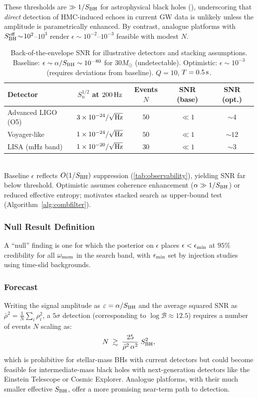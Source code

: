 \documentclass[11pt,a4paper]{article}
\newcommand{\HMC}{\textsc{HMC}\xspace}
\theoremstyle{plain}
\theoremstyle{definition}
\theoremstyle{remark}
\begin{document}
These thresholds are $\gg 1/S_{\rm BH}$ for astrophysical black holes (), underscoring that \emph{direct} detection of \HMC{}-induced echoes in current GW data is unlikely unless the amplitude is parametrically enhanced. 
By contrast, analogue platforms with $S_{\rm BH}^{\rm eff}\!\sim\!10^2$--$10^3$ render $\epsilon\sim 10^{-2}$--$10^{-3}$ feasible with modest $N$.

\begin{table}[t]
\centering
\caption{Back-of-the-envelope SNR for illustrative detectors and stacking assumptions. Baseline: $\epsilon\sim \alpha/S_{\rm BH}\sim 10^{-80}$ for $30M_\odot$ (undetectable). Optimistic: $\epsilon\sim 10^{-3}$ (requires deviations from baseline). $Q=10$, $T=0.5\,{\rm s}$.}
\label{tab:snr}
\small
\begin{tabular}{lcccc}
\hline
Detector & $S_n^{1/2}$ at $200\,{\rm Hz}$ & Events $N$ & SNR (base) & SNR (opt.) \\
\hline
Advanced LIGO (O5) & $3\times 10^{-24}/\sqrt{\rm Hz}$ & $50$ & $\ll 1$ & $\sim 4$ \\
Voyager-like & $1\times 10^{-24}/\sqrt{\rm Hz}$ & $50$ & $\ll 1$ & $\sim 12$ \\
LISA (mHz band) & $1\times 10^{-20}/\sqrt{\rm Hz}$ & $30$ & $\ll 1$ & $\sim 3$ \\
\hline
\end{tabular}
\\[0.5em]
\small Baseline $\epsilon$ reflects $O(1/S_{\rm BH})$ suppression (\cref{tab:observability}), yielding SNR far below threshold. Optimistic assumes coherence enhancement ($\alpha\gg 1/S_{\rm BH}$) or reduced effective entropy; motivates stacked search as upper-bound test (Algorithm~\ref{alg:combfilter}).
\end{table}
\subsubsection{Null Result Definition}
A ``null'' finding is one for which the posterior on $\epsilon$ places $\epsilon<\epsilon_{\rm min}$ at $95\%$ credibility for all $\omega_{\rm mem}$ in the search band,
with $\epsilon_{\rm min}$ set by injection studies using time-slid backgrounds.

\subsubsection{Forecast} Writing the signal amplitude as $\varepsilon=\alpha/S_{\rm BH}$ and the average squared SNR as $\bar{\rho}^2=\frac{1}{N}\sum_i \rho_i^2$, a $5\sigma$ detection (corresponding to $\log\mathcal{B} \approx 12.5$) requires a number of events $N$ scaling as:
\begin{equation}
N \;\gtrsim\; \frac{25}{\bar{\rho}^2\,\alpha^2}\; S_{\rm BH}^2,
\end{equation}
which is prohibitive for stellar-mass BHs with current detectors but could become feasible for intermediate-mass black holes with next-generation detectors like the Einstein Telescope or Cosmic Explorer. Analogue platforms, with their much smaller effective $S_{\rm BH}$, offer a more promising near-term path to detection.
\end{document}
